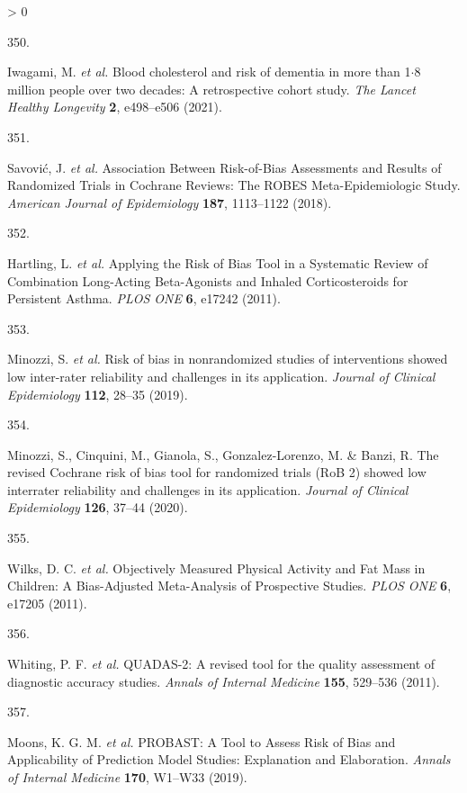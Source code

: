 \documentclass[a4paper, twoside]{templates/ociamthesis}
\newlength{\cslhangindent}
\newlength{\csllabelwidth}
\newenvironment{CSLReferences}[3] %
 {%
  \setlength{\parindent}{0pt}
  \ifodd #1 \everypar{\setlength{\hangindent}{\cslhangindent}}\ignorespaces\fi
  \ifnum #2 > 0
  \setlength{\parskip}{#2\baselineskip}
  \fi
 }%
 {}
\newcommand{\CSLLeftMargin}[1]{\parbox[t]{\maxof{\widthof{#1}}{\csllabelwidth}}{#1}}
\newcommand{\CSLRightInline}[1]{\parbox[t]{\linewidth - \csllabelwidth}{#1}}
\begin{document}
\begin{CSLReferences}{0}{0}
\leavevmode\hypertarget{ref-iwagami2021}{}%
\CSLLeftMargin{350. }
\CSLRightInline{Iwagami, M. \emph{et al.} Blood cholesterol and risk of dementia in more than 1{\(\cdot\)}8 million people over two decades: A retrospective cohort study. \emph{The Lancet Healthy Longevity} \textbf{2}, e498--e506 (2021).}

\leavevmode\hypertarget{ref-savovic2018}{}%
\CSLLeftMargin{351. }
\CSLRightInline{Savović, J. \emph{et al.} Association {Between Risk}-of-{Bias Assessments} and {Results} of {Randomized Trials} in {Cochrane Reviews}: The {ROBES Meta}-{Epidemiologic Study}. \emph{American Journal of Epidemiology} \textbf{187}, 1113--1122 (2018).}

\leavevmode\hypertarget{ref-hartling2011}{}%
\CSLLeftMargin{352. }
\CSLRightInline{Hartling, L. \emph{et al.} Applying the {Risk} of {Bias Tool} in a {Systematic Review} of {Combination Long}-{Acting Beta}-{Agonists} and {Inhaled Corticosteroids} for {Persistent Asthma}. \emph{PLOS ONE} \textbf{6}, e17242 (2011).}

\leavevmode\hypertarget{ref-minozzi2019}{}%
\CSLLeftMargin{353. }
\CSLRightInline{Minozzi, S. \emph{et al.} Risk of bias in nonrandomized studies of interventions showed low inter-rater reliability and challenges in its application. \emph{Journal of Clinical Epidemiology} \textbf{112}, 28--35 (2019).}

\leavevmode\hypertarget{ref-minozzi2020}{}%
\CSLLeftMargin{354. }
\CSLRightInline{Minozzi, S., Cinquini, M., Gianola, S., Gonzalez-Lorenzo, M. \& Banzi, R. The revised {Cochrane} risk of bias tool for randomized trials ({RoB} 2) showed low interrater reliability and challenges in its application. \emph{Journal of Clinical Epidemiology} \textbf{126}, 37--44 (2020).}

\leavevmode\hypertarget{ref-wilks2011}{}%
\CSLLeftMargin{355. }
\CSLRightInline{Wilks, D. C. \emph{et al.} Objectively {Measured Physical Activity} and {Fat Mass} in {Children}: A {Bias}-{Adjusted Meta}-{Analysis} of {Prospective Studies}. \emph{PLOS ONE} \textbf{6}, e17205 (2011).}

\leavevmode\hypertarget{ref-whiting2011}{}%
\CSLLeftMargin{356. }
\CSLRightInline{Whiting, P. F. \emph{et al.} {QUADAS}-2: A revised tool for the quality assessment of diagnostic accuracy studies. \emph{Annals of Internal Medicine} \textbf{155}, 529--536 (2011).}

\leavevmode\hypertarget{ref-moons2019}{}%
\CSLLeftMargin{357. }
\CSLRightInline{Moons, K. G. M. \emph{et al.} {PROBAST}: A {Tool} to {Assess Risk} of {Bias} and {Applicability} of {Prediction Model Studies}: Explanation and {Elaboration}. \emph{Annals of Internal Medicine} \textbf{170}, W1--W33 (2019).}


\end{CSLReferences}
\end{document}
